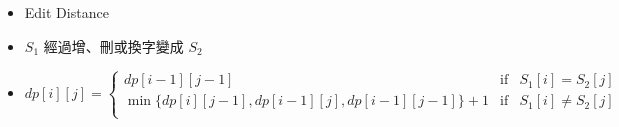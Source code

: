 \begin{itemize}

    \item Edit Distance
        \item $S_1$ 經過增、刪或換字變成 $S_2$
        \item $dp[i][j] = \left \{
            \begin{array}{lrc}
                dp[i-1][j-1] & \mbox{if} & S_1[i] = S_2[j] \\
                \min\{ dp[i][j-1], dp[i-1][j], dp[i-1][j-1]\}+1 & \mbox{if} & S_1[i] \neq S_2[j] \\
            \end{array}\right .$
        
    \end{itemize}